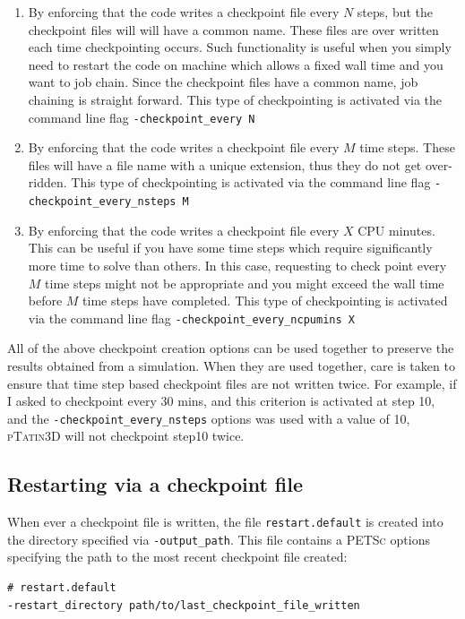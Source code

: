 \documentclass[paper=a4, fontsize=10pt,twoside]{scrartcl}
\newcommand{\ptat}{{{\textsc{pTatin3D}}}}
\newcommand{\PETSc}{{{\textsc{PETSc}}}}
\begin{document}
\begin{enumerate}
\item By enforcing that the code writes a checkpoint file every $N$ steps, but the checkpoint files will will have a common name.
These files are over written each time checkpointing occurs. 
Such functionality is useful when you simply need to restart the code on machine which allows a fixed wall time and you want to job chain.
Since the checkpoint files have a common name, job chaining is straight forward.
This type of checkpointing is activated via the command line flag \newline
{\tt -checkpoint\_every N}

\item By enforcing that the code writes a checkpoint file every $M$ time steps. 
These files will have a file name with a unique extension, thus they do not get over-ridden.
This type of checkpointing is activated via the command line flag \newline
{\tt -checkpoint\_every\_nsteps M}

\item By enforcing that the code writes a checkpoint file every $X$ CPU minutes. 
This can be useful if you have some time steps which require significantly more time to solve than others.
In this case, requesting to check point every $M$ time steps might not be appropriate and you might exceed the wall time before $M$ time steps have completed.
This type of checkpointing is activated via the command line flag\newline
{\tt -checkpoint\_every\_ncpumins X}
\end{enumerate}

All of the above checkpoint creation options can be used together to preserve the results obtained from a simulation.
When they are used together, care is taken to ensure that time step based checkpoint files are not written twice.
For example, if I asked to checkpoint every 30 mins, and this criterion is activated at step 10, and the {\tt -checkpoint\_every\_nsteps} options was used with a value of 10, {\ptat} will not checkpoint step10 twice.

\subsection{Restarting via a checkpoint file}

When ever a checkpoint file is written, the file {\tt restart.default} is created into the directory specified via {\tt -output\_path}.
This file contains a {\PETSc} options specifying the path to the most recent checkpoint file created:
\begin{lstlisting}
# restart.default
-restart_directory path/to/last_checkpoint_file_written
\end{lstlisting}
\end{document}
